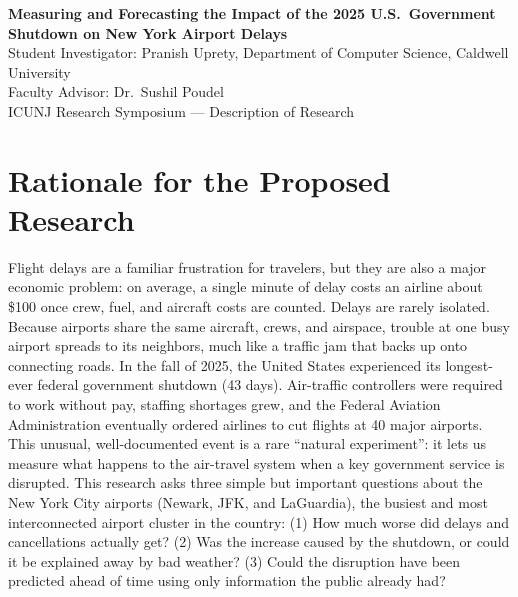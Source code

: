 \documentclass[11pt]{article}
\begin{document}
\begin{center}
{\Large\bfseries Measuring and Forecasting the Impact of the 2025 U.S.\
Government Shutdown on New York Airport Delays}\\[4pt]
{\normalsize Student Investigator: Pranish Uprety, Department of Computer
Science, Caldwell University}\\
{\normalsize Faculty Advisor: Dr.\ Sushil Poudel}\\
{\normalsize ICUNJ Research Symposium --- Description of Research}
\end{center}

\section*{Rationale for the Proposed Research}
Flight delays are a familiar frustration for travelers, but they are also a
major economic problem: on average, a single minute of delay costs an airline
about \$100 once crew, fuel, and aircraft costs are counted. Delays are rarely
isolated. Because airports share the same aircraft, crews, and airspace, trouble
at one busy airport spreads to its neighbors, much like a traffic jam that backs
up onto connecting roads. In the fall of 2025, the United States experienced its
longest-ever federal government shutdown (43 days). Air-traffic controllers were
required to work without pay, staffing shortages grew, and the Federal Aviation
Administration eventually ordered airlines to cut flights at 40 major airports.
This unusual, well-documented event is a rare ``natural experiment'': it lets us
measure what happens to the air-travel system when a key government service is
disrupted. This research asks three simple but important questions about the New
York City airports (Newark, JFK, and LaGuardia), the busiest and most
interconnected airport cluster in the country: (1) How much worse did delays and
cancellations actually get? (2) Was the increase caused by the shutdown, or could
it be explained away by bad weather? (3) Could the disruption have been predicted
ahead of time using only information the public already had?
\end{document}
